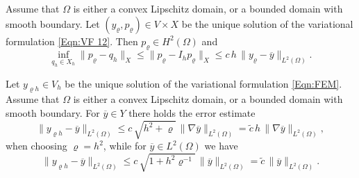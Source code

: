 \documentclass[10pt,a4paper]{amsart}
\newcommand{\norm}[1]{\|#1\|}
\begin{document}
\begin{lemma}
  Assume that $\Omega$ is either a convex Lipschitz domain, or a bounded
  domain with smooth boundary.
  Let $(y_\varrho,p_\varrho) \in V \times X$ be the unique solution of the
  variational formulation \eqref{Eqn:VF 12}. Then $p_\varrho\in H^2(\Omega)$ and
  \begin{equation}\label{Eqn:Error p}
    \inf_{q_h\in X_h}\| p_\varrho - q_h \|_X \leq \norm{p_\varrho-I_h p_\varrho}_X\leq 
    c \, h \, \| y_\varrho - \overline{y} \|_{L^2(\Omega)} .
  \end{equation}
\end{lemma}

\begin{theorem}
  Let $y_{\varrho h} \in V_h$ be the unique solution of the variational
  formulation \eqref{Eqn:FEM}. Assume that $\Omega$ is either a convex Lipschitz domain, or a bounded domain with smooth boundary. For $\overline{y} \in Y$ there holds the error estimate
  \begin{equation}\label{Eqn:Error Y}
    \| y_{\varrho h} - \overline{y} \|_{L^2(\Omega)} \leq
    c \, \sqrt{h^2 + \varrho} \, \| \nabla \overline{y} \|_{L^2(\Omega)} =
    \widetilde{c} \, h \, \| \nabla \overline{y} \|_{L^2(\Omega)},
  \end{equation}
  when choosing $\varrho = h^2$, while for $\overline{y} \in L^2(\Omega)$
  we have
   \begin{equation}\label{Eqn:Error L2}
    \| y_{\varrho h} - \overline{y} \|_{L^2(\Omega)} \leq
    c \, \sqrt{1 + h^2 \varrho^{-1}} \, \| \overline{y} \|_{L^2(\Omega)} =
    \widetilde{c} \, \| \overline{y} \|_{L^2(\Omega)}.
  \end{equation}
\end{theorem}
\end{document}
